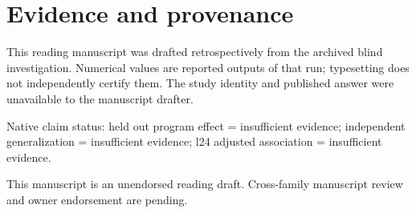 \documentclass[10pt,a4paper]{article}
\begin{document}
\section*{Evidence and provenance}
This reading manuscript was drafted retrospectively from the archived blind investigation. Numerical values are reported outputs of that run; typesetting does not independently certify them. The study identity and published answer were unavailable to the manuscript drafter.
\par
Native claim status: held out program effect = insufficient evidence; independent generalization = insufficient evidence; l24 adjusted association = insufficient evidence.
\par
This manuscript is an unendorsed reading draft. Cross-family manuscript review and owner endorsement are pending.
\par
\end{document}
